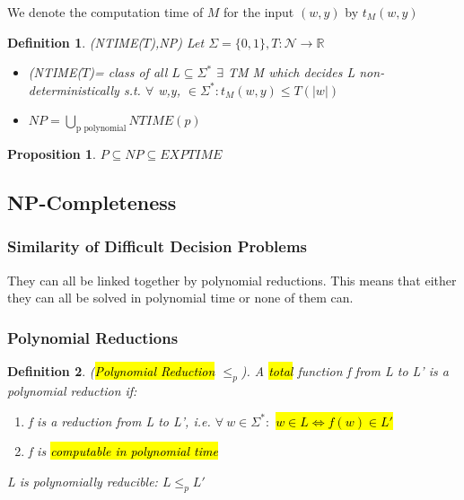 \documentclass[a3paper, 8pt]{extarticle}
\newtheorem{proposition}{Proposition}[section]
\newtheorem*{definition}{Definition}
\begin{document}
\begin{multicols*}{6}
We denote the computation time of $M$ for the input $(w,y)$ by $t_M(w,y)$

\begin{definition}
    \textsc{(NTIME($T$),NP)} Let $\Sigma=\{0,1\}, T:\mathcal{N}\to \mathbb{R}$\begin{itemize}
        \item \textsc{(NTIME($T$)}= class of all $L\subseteq\Sigma^*$  $\exists$ TM M which decides L non-deterministically s.t. $\forall$ w,y, $\in \Sigma^*:t_M(w,y) \leq T(|w|)$
        \item $NP=\underset{\text{p polynomial}}{\bigcup}NTIME(p)$
    \end{itemize}
\end{definition}

\begin{proposition}
    $P \subseteq NP \subseteq EXPTIME$
\end{proposition}

\subsection{NP-Completeness}
\subsubsection{Similarity of Difficult Decision Problems} They can all be linked together by polynomial reductions. This means that either they can all be solved in polynomial time or none of them can.

\subsubsection{Polynomial Reductions}
\begin{definition}
    (\hl{Polynomial Reduction} $\leq_p$). A \hl{total} function f from L to L' is a polynomial reduction if: \begin{enumerate}
        \item f is a reduction from L to L', i.e. $\forall \ w \in \Sigma^*:$ \hl{$w \in L \iff f(w) \in L'$}
        \item f is \hl{computable in polynomial time}
    \end{enumerate}
    L is polynomially reducible: $L \leq_p L'$
\end{definition}


\end{multicols*}
\end{document}
